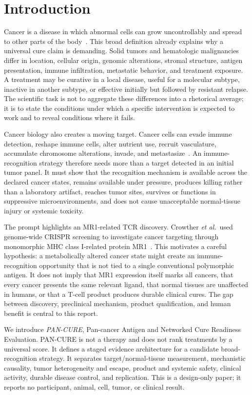 \documentclass[10pt,conference]{IEEEtran}
\begin{document}
\section{Introduction}\label{sec:intro}
Cancer is a disease in which abnormal cells can grow uncontrollably and spread to other parts of the body~\cite{nci}. This broad definition already explains why a universal cure claim is demanding. Solid tumors and hematologic malignancies differ in location, cellular origin, genomic alterations, stromal structure, antigen presentation, immune infiltration, metastatic behavior, and treatment exposure. A treatment may be curative in a local disease, useful for a molecular subtype, inactive in another subtype, or effective initially but followed by resistant relapse. The scientific task is not to aggregate these differences into a rhetorical average; it is to state the conditions under which a specific intervention is expected to work and to reveal conditions where it fails.

Cancer biology also creates a moving target. Cancer cells can evade immune detection, reshape immune cells, alter nutrient use, recruit vasculature, accumulate chromosome alterations, invade, and metastasize~\cite{nci,hanahan2022}. An immune-recognition strategy therefore needs more than a target detected in an initial tumor panel. It must show that the recognition mechanism is available across the declared cancer states, remains available under pressure, produces killing rather than a laboratory artifact, reaches tumor sites, survives or functions in suppressive microenvironments, and does not cause unacceptable normal-tissue injury or systemic toxicity.

The prompt highlights an MR1-related TCR discovery. Crowther \emph{et al.}\ used genome-wide CRISPR screening to investigate cancer targeting through monomorphic MHC class I-related protein MR1~\cite{crowther2020}. This motivates a careful hypothesis: a metabolically altered cancer state might create an immune-recognition opportunity that is not tied to a single conventional polymorphic antigen. It does not imply that MR1 expression itself marks all cancers, that every cancer presents the same relevant ligand, that normal tissues are unaffected in humans, or that a T-cell product produces durable clinical cures. The gap between discovery, preclinical mechanism, product qualification, and human benefit is central to this report.

We introduce \emph{PAN-CURE}, Pan-cancer Antigen and Networked Cure Readiness Evaluation. PAN-CURE is not a therapy and does not rank treatments by a universal score. It defines a staged evidence architecture for a candidate broad-recognition strategy. It separates target/normal-tissue measurement, mechanistic causality, tumor heterogeneity and escape, product and systemic safety, clinical activity, durable disease control, and replication. This is a design-only paper; it reports no participant, animal, cell, tumor, or clinical result.
\end{document}
